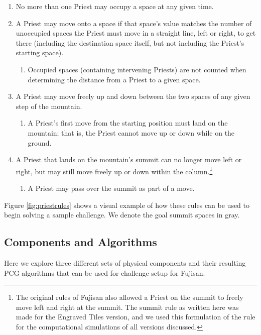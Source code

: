 \documentclass[journal]{IEEEtran}
\begin{document}
\begin{enumerate}
\item No more than one Priest may occupy a space at any given time.

\item A Priest may move onto a space if that space's value matches the number of unoccupied spaces the Priest must move in a straight line, left or right, to get there (including the destination space itself, but not including the Priest's starting space). %
\begin{enumerate}
\item Occupied spaces (containing intervening Priests) are not counted when determining the distance from a Priest to a given space. %
\end{enumerate}
\item A Priest may move freely up and down between the two spaces of any given step of the mountain. %
\begin{enumerate}
\item A Priest's first move from the starting position must land on the mountain; that is, the Priest cannot move up or down while on the ground.
\end{enumerate}

\item A Priest that lands on the mountain's summit can no longer move left or right, but may still move freely up or down within the column.\footnote{The original rules of Fujisan also allowed a Priest on the summit to freely move left and right at the summit. The summit rule as written here was made for the Engraved Tiles version, and we used this formulation of the rule for the computational simulations of all versions discussed.}
\begin{enumerate}
\item A Priest may pass over the summit as part of a move.
\end{enumerate}
\end{enumerate}

Figure \ref{fig:priestrules} shows a visual example of how these rules can be used to begin solving a sample challenge. We denote the goal summit spaces in gray. 

%
%

%

%
%
%
%
%
%
%

%

%
%
%
%
%
%

%

\subsection{Components and Algorithms}
\label{section:pcgalgs}
\noindent
Here we explore three different sets of physical components and their resulting PCG algorithms that can be used for challenge setup for Fujisan. 
\end{document}
